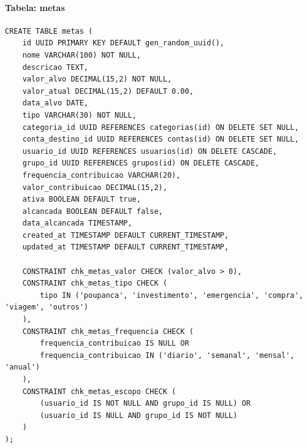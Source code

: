 \paragraph{Tabela: metas}
\begin{lstlisting}[caption=Estrutura da tabela metas]
CREATE TABLE metas (
    id UUID PRIMARY KEY DEFAULT gen_random_uuid(),
    nome VARCHAR(100) NOT NULL,
    descricao TEXT,
    valor_alvo DECIMAL(15,2) NOT NULL,
    valor_atual DECIMAL(15,2) DEFAULT 0.00,
    data_alvo DATE,
    tipo VARCHAR(30) NOT NULL,
    categoria_id UUID REFERENCES categorias(id) ON DELETE SET NULL,
    conta_destino_id UUID REFERENCES contas(id) ON DELETE SET NULL,
    usuario_id UUID REFERENCES usuarios(id) ON DELETE CASCADE,
    grupo_id UUID REFERENCES grupos(id) ON DELETE CASCADE,
    frequencia_contribuicao VARCHAR(20),
    valor_contribuicao DECIMAL(15,2),
    ativa BOOLEAN DEFAULT true,
    alcancada BOOLEAN DEFAULT false,
    data_alcancada TIMESTAMP,
    created_at TIMESTAMP DEFAULT CURRENT_TIMESTAMP,
    updated_at TIMESTAMP DEFAULT CURRENT_TIMESTAMP,
    
    CONSTRAINT chk_metas_valor CHECK (valor_alvo > 0),
    CONSTRAINT chk_metas_tipo CHECK (
        tipo IN ('poupanca', 'investimento', 'emergencia', 'compra', 'viagem', 'outros')
    ),
    CONSTRAINT chk_metas_frequencia CHECK (
        frequencia_contribuicao IS NULL OR 
        frequencia_contribuicao IN ('diario', 'semanal', 'mensal', 'anual')
    ),
    CONSTRAINT chk_metas_escopo CHECK (
        (usuario_id IS NOT NULL AND grupo_id IS NULL) OR
        (usuario_id IS NULL AND grupo_id IS NOT NULL)
    )
);
\end{lstlisting}

